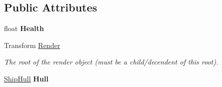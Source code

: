 \subsection*{Public Attributes}
\begin{DoxyCompactItemize}
\item 
\hypertarget{class_skyrates_1_1_entity_1_1_entity_ship_a79bcf33d8d4eec87613cecb746cceba9}{float {\bfseries Health}}\label{class_skyrates_1_1_entity_1_1_entity_ship_a79bcf33d8d4eec87613cecb746cceba9}

\item 
Transform \hyperlink{class_skyrates_1_1_entity_1_1_entity_ship_ac8dafb0de0a71b2a0094d639385af28c}{Render}
\begin{DoxyCompactList}\small\item\em The root of the render object (must be a child/decendent of this root). \end{DoxyCompactList}\item 
\hypertarget{class_skyrates_1_1_entity_1_1_entity_ship_a2f51952561caa8b82a47294311474ccb}{\hyperlink{class_skyrates_1_1_ship_1_1_ship_hull}{Ship\-Hull} {\bfseries Hull}}\label{class_skyrates_1_1_entity_1_1_entity_ship_a2f51952561caa8b82a47294311474ccb}

\end{DoxyCompactItemize}
